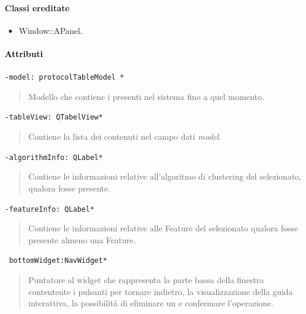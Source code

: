 \paragraph{Classi ereditate\\}
\begin{itemize}
\item Window::APanel.
\end{itemize}
\paragraph{\textcolor{black}{Attributi\\}}
\color{teal}\verb!-model: protocolTableModel *!
\begin{quote}
\color{black}Modello che contiene i \protocol{} presenti nel sistema fino a quel momento.
\end{quote}
\color{teal}\verb!-tableView: QTabelView*!
\color{black}
\begin{quote}
Contiene la lista dei \protocol{} contenuti nel campo dati \emph{model}.
\end{quote}
\color{teal}\verb!-algorithmInfo: QLabel*!
\begin{quote}
\color{black}
Contiene le informazioni relative all'algoritmo di clustering\g{} del \protocol{} selezionato, qualora fosse presente.
\end{quote}
\color{teal}\verb!-featureInfo: QLabel*!
\color{black}
\begin{quote}
Contiene le informazioni relative alle Feature\g{} del \protocol{} selezionato qualora fosse presente almeno una Feature\g{}.
\end{quote}
\color{teal}\verb! bottomWidget:NavWidget*!
\color{black} 
\begin{quote}
Puntatore al widget che rappresenta la parte bassa della finestra contentente i pulsanti per tornare indietro, la visualizzazione della guida interattiva, la possibilità di eliminare un \protocol{} e confermare l'operazione.
\end{quote}
